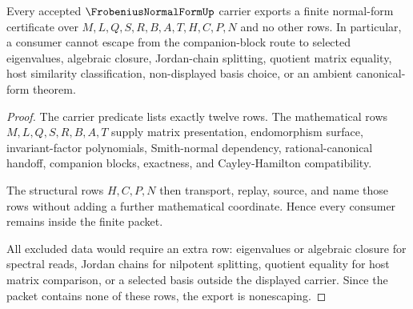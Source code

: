 \begin{theorem}
\label{thm:frobenius-normal-form-finite-nonescape}
Every accepted $\FrobeniusNormalFormUp$ carrier exports a finite normal-form certificate over $M,L,Q,S,R,B,A,T,H,C,P,N$ and no other rows. In particular, a consumer cannot escape from the companion-block route to selected eigenvalues, algebraic closure, Jordan-chain splitting, quotient matrix equality, host similarity classification, non-displayed basis choice, or an ambient canonical-form theorem.
\end{theorem}
\begin{proof}
The carrier predicate lists exactly twelve rows. The mathematical rows $M,L,Q,S,R,B,A,T$ supply matrix presentation, endomorphism surface, invariant-factor polynomials, Smith-normal dependency, rational-canonical handoff, companion blocks, exactness, and Cayley-Hamilton compatibility.

The structural rows $H,C,P,N$ then transport, replay, source, and name those rows without adding a further mathematical coordinate. Hence every consumer remains inside the finite packet.

All excluded data would require an extra row: eigenvalues or algebraic closure for spectral reads, Jordan chains for nilpotent splitting, quotient equality for host matrix comparison, or a selected basis outside the displayed carrier. Since the packet contains none of these rows, the export is nonescaping.
\end{proof}




